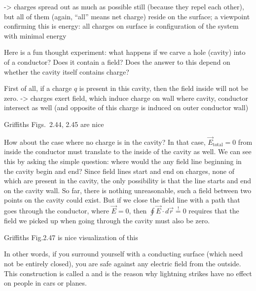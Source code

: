 \documentclass[../class_mech_main.tex]{subfiles}
\begin{document}
-> charges spread out as much as possible still (because they repel each other), but all of them (again, \enquote{all} means net charge) reside on the surface; a viewpoint confirming this is energy: all charges on surface is configuration of the system with minimal energy


\begin{ex}
    Here is a fun thought experiment: what happens if we carve a hole (cavity) into of a conductor? Does it contain a field? Does the answer to this depend on whether the cavity itself contains charge?

    First of all, if a charge $q$ is present in this cavity, then the field inside will not be zero. -> charges exert field, which induce charge on wall where cavity, conductor intersect as well (and opposite of this charge is induced on outer conductor wall)


    Griffiths Figs.~2.44, 2.45 are nice


    How about the case where no charge is in the cavity? In that case, $\vec{E}_\text{total} = 0$ from inside the conductor must translate to the inside of the cavity as well. We can see this by asking the simple question: where would the any field line beginning in the cavity begin and end? Since field lines start and end on charges, none of which are present in the cavity, the only possibility is that the line starts and end on the cavity wall. So far, there is nothing unreasonable, such a field between two points on the cavity could exist. But if we close the field line with a path that goes through the conductor, where $\vec{E} = 0$, then $\oint \vec{E} \cdot d\vec{r} \overset{!}{=} 0$ requires that the field we picked up when going through the cavity must also be zero.

    Griffiths Fig.2.47 is nice visualization of this

    In other words, if you surround yourself with a conducting surface (which need not be entirely closed), you are safe against any electric field from the outside. This construction is called a  and is the reason why lightning strikes have no effect on people in cars or planes.
\end{ex}
\end{document}
